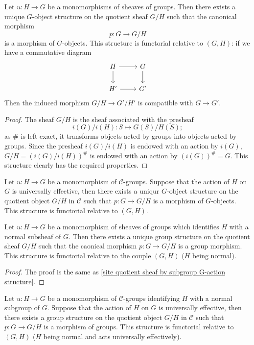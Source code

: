 \begin{proposition}\label{site quotient sheaf by subgroup G-action structure}
Let $u:H\to G$ be a monomorphisms of sheaves of groups. Then there exists a unique $G$-object structure on the quotient sheaf $G/H$ such that the canonical morphism
\[p:G\to G/H\]
is a morphism of $G$-objects. This structure is functorial relative to $(G,H)$: if we have a commutative diagram
\[\begin{tikzcd}
H\ar[r]\ar[d]&G\ar[d]\\
H'\ar[r]&G'
\end{tikzcd}\]
Then the induced morphism $G/H\to G'/H'$ is compatible with $G\to G'$.
\end{proposition}
\begin{proof}
The sheaf $G/H$ is the sheaf associated with the presheaf
\[i(G)/i(H):S\mapsto G(S)/H(S);\]
as $\#$ is left exact, it transforms objects acted by groups into objects acted by groups. Since the presheaf $i(G)/i(H)$ is endowed with an action by $i(G)$, $G/H=(i(G)/i(H))^\#$ is endowed with an action by $(i(G))^\#=G$. This structure clearly has the required properties.
\end{proof}

\begin{corollary}\label{site quotient by universally effective subgroup G-action structure}
Let $u:H\to G$ be a monomorphism of $\mathcal{C}$-groups. Suppose that the action of $H$ on $G$ is universally effective, then there exists a uniqur $G$-object structure on the quotient object $G/H$ in $\mathcal{C}$ such that $p:G\to G/H$ is a morphism of $G$-objects. This structure is functorial relative to $(G,H)$.
\end{corollary}

\begin{proposition}\label{site quotient sheaf by normal subgroup group structure}
Let $u:H\to G$ be a monomorphism of sheaves of groups which identifies $H$ with a normal subsheaf of $G$. Then there exists a unique group structure on the quotient sheaf $G/H$ such that the caonical morphism $p:G\to G/H$ is a group morphism. This structure is functorial relative to the couple $(G,H)$ ($H$ being normal).
\end{proposition}
\begin{proof}
The proof is the same as \cref{site quotient sheaf by subgroup G-action structure}.
\end{proof}

\begin{corollary}\label{site quotient by universally effective normal subgroup group structure}
Let $u:H\to G$ be a monomorphism of $\mathcal{C}$-groups identifying $H$ with a normal subgroup of $G$. Suppose that the action of $H$ on $G$ is universally effective, then there exists a group structure on the quotient object $G/H$ in $\mathcal{C}$ such that $p:G\to G/H$ is a morphism of groups. This structure is functorial relative to $(G,H)$ ($H$ being normal and acts universally effectively).
\end{corollary}

